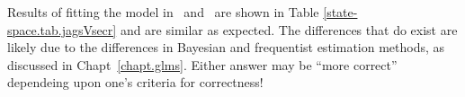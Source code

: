 Results of fitting the model in \jags~and \secr~are shown in Table
\ref{state-space.tab.jagsVsecr} and are
similar as expected. The differences that do exist are likely due to
the differences in Bayesian and frequentist estimation methods, as
discussed in Chapt~\ref{chapt.glms}. Either answer may be ``more
correct'' dependeing upon one's criteria for correctness!

